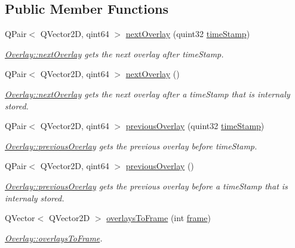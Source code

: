 \subsection*{Public Member Functions}
\begin{DoxyCompactItemize}
\item 
Q\+Pair$<$ Q\+Vector2D, qint64 $>$ \hyperlink{classOverlay_a921b608d3714021e122fde3d153f506a}{next\+Overlay} (quint32 \hyperlink{classOverlay_aba30f4cadbcfead2b1b44915617f0d32}{time\+Stamp})
\begin{DoxyCompactList}\small\item\em \hyperlink{classOverlay_a921b608d3714021e122fde3d153f506a}{Overlay\+::next\+Overlay} gets the next overlay after time\+Stamp. \end{DoxyCompactList}\item 
Q\+Pair$<$ Q\+Vector2D, qint64 $>$ \hyperlink{classOverlay_a08d7f62632a8b2e64a8bb0e9c2860cd3}{next\+Overlay} ()
\begin{DoxyCompactList}\small\item\em \hyperlink{classOverlay_a921b608d3714021e122fde3d153f506a}{Overlay\+::next\+Overlay} gets the next overlay after a time\+Stamp that is internaly stored. \end{DoxyCompactList}\item 
Q\+Pair$<$ Q\+Vector2D, qint64 $>$ \hyperlink{classOverlay_ae47a6d898295796503682a65ea31ae41}{previous\+Overlay} (quint32 \hyperlink{classOverlay_aba30f4cadbcfead2b1b44915617f0d32}{time\+Stamp})
\begin{DoxyCompactList}\small\item\em \hyperlink{classOverlay_ae47a6d898295796503682a65ea31ae41}{Overlay\+::previous\+Overlay} gets the previous overlay before time\+Stamp. \end{DoxyCompactList}\item 
Q\+Pair$<$ Q\+Vector2D, qint64 $>$ \hyperlink{classOverlay_abc4a1e11befa7b8f4cf639d7528c3e27}{previous\+Overlay} ()
\begin{DoxyCompactList}\small\item\em \hyperlink{classOverlay_ae47a6d898295796503682a65ea31ae41}{Overlay\+::previous\+Overlay} gets the previous overlay before a time\+Stamp that is internaly stored. \end{DoxyCompactList}\item 
Q\+Vector$<$ Q\+Vector2D $>$ \hyperlink{classOverlay_a64f4cbdcaab04599465bc4381c134646}{overlays\+To\+Frame} (int \hyperlink{classOverlay_a39d037dcbfcdc8f2aaa39951bcd9acfc}{frame})
\begin{DoxyCompactList}\small\item\em \hyperlink{classOverlay_a64f4cbdcaab04599465bc4381c134646}{Overlay\+::overlays\+To\+Frame}. \end{DoxyCompactList}\item 

\end{DoxyCompactItemize}
